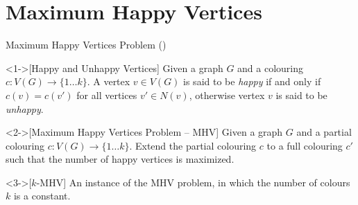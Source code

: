 \documentclass[11pt,t, usenames, dvipsnames]{beamer}
\newcommand{\T}{\mathcal{T}}
\newcommand{\bigO}{\mathcal{O}}
\newcommand{\fancyP}{\mathcal{P}}
\newcommand{\fancyH}{\mathcal{H}}
\begin{document}
        
        




\section{Maximum Happy Vertices}

\begin{frame}{Maximum Happy Vertices Problem (\cite{zhang2015algorithmic})}
    \begin{definition}<1->[Happy and Unhappy Vertices]
		Given a graph $G$ and a colouring $c:V(G)\rightarrow \{1 \dots k\}$. A vertex $v \in V(G)$ is said to be \textit{happy} if and only if $c(v) = c(v')$ for all vertices $v' \in N(v)$, otherwise vertex $v$ is said to be \textit{unhappy}. 
	\end{definition}
	\begin{definition}<2->[Maximum Happy Vertices Problem -- MHV]
		Given a graph $G$ and a partial colouring $c:V(G)\rightarrow \{1 \dots k\}$. Extend the partial colouring $c$ to a full colouring $c'$ such that the number of happy vertices is maximized.
	\end{definition}
	\begin{definition}<3->[$k$-MHV]
	    An instance of the MHV problem, in which the number of colours $k$ is a constant. 
	\end{definition}
\end{frame} 
\end{document}
